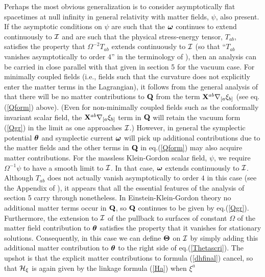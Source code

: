 Perhaps the most obvious generalization is to consider asymptotically
flat spacetimes at null infinity in general relativity with matter
fields, $\psi$, also present. If the asymptotic conditions on $\psi$
are such that the ${\mbox{\boldmath $\omega$}}$ continues to extend
continuously to $\cal I$ and are such that the physical stress-energy
tensor, $T_{ab}$, satisfies the property that $\Omega^{-2} T_{ab}$
extends continuously to $\cal I$ (so that ``$T_{ab}$ vanishes
asymptotically to order $4$'' in the terminology of \cite{g}), then an
analysis can be carried in close parallel with that given in section 5
for the vacuum case.  For minimally coupled fields (i.e., fields such
that the curvature does not explicitly enter the matter terms in the
Lagrangian), it follows from the general analysis of \cite{iw} that
there will be no matter contributions to $\bf Q$ from the term ${\bf
X}^{ab} \nabla_{[a} \xi_{b]}$ (see eq.(\ref{Qform}) above). (Even for
non-minimally coupled fields such as the conformally invariant scalar
field, the ${\bf X}^{ab} \nabla_{[a} \xi_{b]}$ term in $\bf Q$ will
retain the vacuum form (\ref{Qgr}) in the limit as one approaches
$\cal I$.)  However, in general the symplectic potential
${\mbox{\boldmath $\theta$}}$ and symplectic current ${\mbox{\boldmath
$\omega$}}$ will pick up additional contributions due to the matter
fields and the other terms in $\bf Q$ in eq.(\ref{Qform}) may also
acquire matter contributions. For the massless Klein-Gordon scalar
field, $\psi$, we require $\Omega^{-1} \psi$ to have a smooth limit to
$\cal I$. In that case, ${\mbox{\boldmath $\omega$}}$ extends
continuously to $\cal I$. Although $T_{ab}$ does not actually vanish
asymptotically to order $4$ in this case (see the Appendix of
\cite{qw}), it appears that all the essential features of the analysis
of section 5 carry through nonetheless. In Einstein-Klein-Gordon
theory no additional matter terms occur in $\bf Q$, so $\bf Q$
continues to be given by eq.(\ref{Qgr}). Furthermore, the extension to
$\cal I$ of the pullback to surfaces of constant $\Omega$ of the
matter field contribution to ${\mbox{\boldmath $\theta$}}$ satisfies
the property that it vanishes for stationary solutions. Consequently,
in this case we can define ${\mbox{\boldmath $\Theta$}}$ on $\cal I$
by simply adding this additional matter contribution to
${\mbox{\boldmath $\theta$}}$ to the right side of
eq.(\ref{Thetascri}). The upshot is that the explicit matter
contributions to formula (\ref{dhfinal}) cancel, so that ${\cal
H}_\xi$ is again given by the linkage formula (\ref{Ha}) when $\xi^a$
